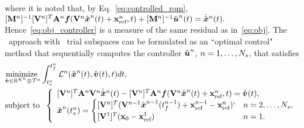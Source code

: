 where it is noted that, by Eq.~\eqref{eq:controlled_rom}, $
[\mathbf{M}^{n}]^{-1}[\mathbf {V}^{n}]^T \mathbf{A}^{n} \boldsymbol f(\mathbf {V}^{n} \hat{ \boldsymbol x}^{n}(t) + \mathbf{x}_\text{ref}^{n} ,t) +
[\mathbf{M}^{n}]^{-1}\hat{\boldsymbol u}^{n}(t)  = \dot{\hat{ \boldsymbol x}}^{n}(t).$ 
Hence~\eqref{eq:obj_controller} is a measure of the same residual as in~\eqref{eq:obj}.  The \methodAcronym\ approach with \spatialAcronym\ trial subspaces can be formulated as an ``optimal control" 
method that sequentially computes the controller ${\hat{\boldsymbol u}^{n}}$, $n=1,\ldots,N_s$, that satisfies 
\begin{equation}\label{eq:tclspg_oc1a} 
\begin{split}
&\underset{\controllerDumArgnt{} \in \RR{\romdimArg{n}}\otimes \timeSpaceArg{n} }{\text{minimize } } 
\int_{\timeStartArg{n}}^{\timeEndArg{n}}
\objectiveControlArg{n}(\genstateArg{n}{t},\controllerDumArg{}{t},t)dt, 
 \\
&\text{subject to } \;  \left\{\begin{array}{l} 
 \basisspaceTArg{n} \stweightingMatArgt{n}{t}
\basisspaceArg{n}  \genstateDotArg{n}{t}  - \basisspaceTArg{n}
\stweightingMatArgt{n}{t} \velocity(\veloargsromn) =\controllerDumArg{}{t}, \\
 \genstateArg{n}{\timeStartArg{n}} =
\begin{cases} \spatialIC `& n = 2,\ldots,\nslabs,
 \\ \genstateICOne & n=1. \end{cases} \end{array} \right.
\end{split}
\end{equation}
